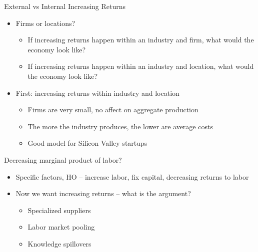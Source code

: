 \documentclass[ignorenonframetext,]{beamer}
\begin{document}
\begin{frame}{External vs Internal Increasing Returns}
    \begin{itemize}
        \item Firms or locations?
        \begin{itemize}
            \item If increasing returns happen within an industry and firm, what would the economy look like?
            \item If increasing returns happen within an industry and location, what would the economy look like? 
        \end{itemize}
        \item First: increasing returns within industry and location
        \begin{itemize}
            \item Firms are very small, no affect on aggregate production 
            \item The more the industry produces, the lower are average costs
            \item Good model for Silicon Valley startups
        \end{itemize}
    \end{itemize}
\end{frame}
\begin{frame}{Decreasing marginal product of labor?}

    \begin{itemize}
        \item Specific factors, HO -- increase labor, fix capital, decreasing returns to labor
        \item Now we want increasing returns -- what is the argument?
        \begin{itemize}
            \item Specialized suppliers
            \item Labor market pooling
            \item Knowledge spillovers
        \end{itemize}
    \end{itemize}

\end{frame}
\end{document}
